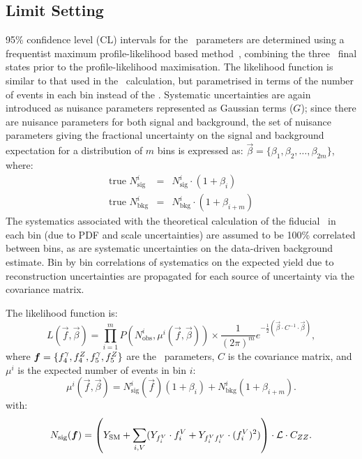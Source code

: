 \subsection{Limit Setting}

95\% confidence level (CL) intervals for the \TGC\ parameters are determined
using a frequentist maximum profile-likelihood based method~\cite{Cowan:2010js},
combining the three \lllplp\ final states prior to
the profile-likelihood maximisation. The likelihood function is similar
to that used in the \cx\ calculation, but parametrised in terms of the
number of events in each bin instead of the \cx. Systematic uncertainties are
again introduced as nuisance parameters 
represented as Gaussian terms ($G$); since there are nuisance
parameters for both signal and background, the set of nuisance parameters giving
the fractional uncertainty on the signal and background expectation for a
distribution of $m$ bins is expressed as:
$\vec\beta = \{\beta_1, \beta_2, \ldots, \beta_{2m}\}$, where:
\begin{eqnarray}
\text{true }N_\mathrm{sig}^i &=& N_\mathrm{sig}^i \cdot (1 + \beta_i) \label{nuis1}\\
\text{true }N_\mathrm{bkg}^i &=& N_\mathrm{bkg}^i \cdot (1 + \beta_{i+m}) \label{nuis2}
\end{eqnarray}
The systematics associated with the theoretical calculation of the fiducial \cx\ in each bin
(due to PDF and scale uncertainties) are assumed to be 100\% correlated between
bins, as are systematic uncertainties on the data-driven background estimate.
Bin by bin correlations of systematics on the expected yield due to
reconstruction uncertainties are propagated for each source of uncertainty via the
covariance matrix. 

The likelihood function is:
\begin{equation}
L(\vec{f}, \vec{\beta}) =
\prod_{i=1}^{m}P(N_\mathrm{obs}^i,\mu^i(\vec{f},\vec\beta))
\times
\frac{1}{(2\pi)^m}e^{-\frac{1}{2}\left(\vec\beta\cdot C^{-1}\cdot\vec\beta\right)},
\label{likelihood}
\end{equation}
where $\vec{f}=\{\ffourg, \ffourZ, \ffiveg, \ffiveZ \}$ are the \TGC\
parameters, $C$ is the covariance matrix, and $\mu^{i}$ is the expected number of events in bin $i$:
\begin{equation}
\mu^i(\vec{f},\vec{\beta})
= N_\mathrm{sig}^i(\vec{f})(1 + \beta_i) + N_\mathrm{bkg}^i(1 + \beta_{i+m}).
\end{equation}
with:
\begin{equation}
N_{\rm sig}(\vec{f}) = \left( Y_\mathrm{\rm SM} + \sum_{i,V} (Y_{f_i^V}\cdot
f_i^V + Y_{f_i^Vf_i^V}\cdot (f_i^V)^2 ) \right) \cdot\mathcal{L}\cdot{C_{ZZ}}.
\end{equation}

